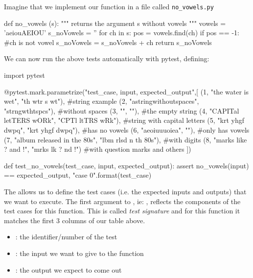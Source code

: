 Imagine that we implement our function in a file called \texttt{no\_vowels.py}

\begin{python}
def no_vowels (s):
    """
    returns the argument s without vowels
    """
    vowels = 'aeiouAEIOU'
    s_noVowels = ''
    for ch in s:
        pos = vowels.find(ch)
        if pos == -1: #ch is not vowel
            s_noVowels = s_noVowels + ch     
    return s_noVowels
\end{python}

We can now run the above tests automatically with pytest, defining:

\begin{python}
import pytest

@pytest.mark.parametrize("test_case, input, expected_output",[
(1, "the water is wet", "th wtr s wt"),             #string example
(2, "astringwithoutspaces", "strngwthtspcs"),       #without spaces
(3, "", ""),                                        #the empty string
(4, "CAPITal letTERS wORk", "CPTl ltTRS wRk"),      #string with capital letters
(5, "krt yhgf dwpq", "krt yhgf dwpq"),              #has no vowels
(6, "aeoiuuuoiea", ""),                             #only has vowels
(7, "album released in the 80s", "lbm rlsd n th 80s"),     #with digits
(8, "marks like ? and !", "mrks lk ? nd !")         #with question marks and others
])

def test_no_vowels(test_case, input, expected_output):
    assert no_vowels(input) == expected_output, "case {0}".format(test_case)
\end{python}

The  allows us to define the test cases (i.e. the expected inputs and outputs) that we want to execute. The first argument to , ie: , reflects the components of the test cases for this function. This is called \emph{test signature} and for this function it matches the first 3 columns of our table above.

\begin{itemize}
    \item {}: the identifier/number of the test
    \item {}: the input we want to give to the function
    \item {}: the output we expect to come out
\end{itemize}

